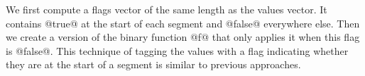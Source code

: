 We first compute a flags vector of the same length as the values vector. It contains @true@ at the start of each segment and @false@ everywhere else. Then we create a version of the binary function @f@ that only applies it when this flag is @false@. This technique of tagging the values with a flag indicating whether they are at the start of a segment is similar to previous approaches\citep{Blelloch:1990vl}.












